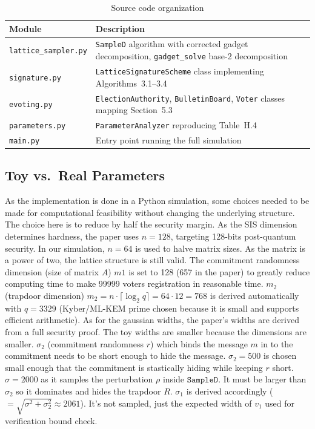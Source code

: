 \documentclass[a4paper]{article}
\begin{document}
\begin{table}[H]
    \centering
    \caption{Source code organization}
    \begin{tabular}{lp{9cm}}
        \toprule
        \textbf{Module}              & \textbf{Description}                                                                                        \\
        \midrule
        \texttt{lattice\_sampler.py} & \texttt{SampleD} algorithm with corrected gadget decomposition, \texttt{gadget\_solve} base-2 decomposition \\
        \texttt{signature.py}        & \texttt{LatticeSignatureScheme} class implementing Algorithms~3.1--3.4                                      \\
        \texttt{evoting.py}          & \texttt{ElectionAuthority}, \texttt{BulletinBoard}, \texttt{Voter} classes mapping Section~5.3              \\
        \texttt{parameters.py}       & \texttt{ParameterAnalyzer} reproducing Table~H.4                                                            \\
        \texttt{main.py}             & Entry point running the full simulation                                                                     \\
        \bottomrule
    \end{tabular}
\end{table}

\subsection{Toy vs.\ Real Parameters}

As the implementation is done in a Python simulation, some choices needed to be made for computational feasibility without changing the underlying structure. The choice here is to reduce by half the security margin. 
As the SIS dimension determines hardness, the paper uses $n=128$, targeting 128-bits post-quantum security. In our simulation, $n=64$ is used to halve matrix sizes. As the matrix is a power of two, the lattice structure is still valid.
The commitment randomness dimension (size of matrix $A$) $m1$ is set to 128 (657 in the paper) to greatly reduce computing time to make 99999 voters registration in reasonable time. $m_2$ (trapdoor dimension) $m_2 = n\cdot\lceil\log_2 q\rceil = 64\cdot12 = 768$ is derived automatically with $q=3329$ (Kyber/ML-KEM prime chosen because it is small and supports efficient arithmetic).
As for the gaussian widths, the paper's widths are derived from a full security proof. The toy widths are smaller because the dimensions are smaller. $\sigma_2$ (commitment randomness $r$) which binds the message $m$ in to the commitment needs to be short enough to hide the message. $\sigma_2=500$ is chosen small enough that the commitment is stastically hiding while keeping $r$ short.
 $\sigma = 2000$ as it samples the perturbation $\rho$ inside $\texttt{SampleD}$. It must be larger than $\sigma_2$ so it dominates and hides the trapdoor $R$.
$\sigma_1$ is derived accordingly ($= \sqrt{\sigma^2 + \sigma_2^2} \approx 2061$). It's not sampled, just the expected width of $v_1$ used for verification bound check.
\end{document}

